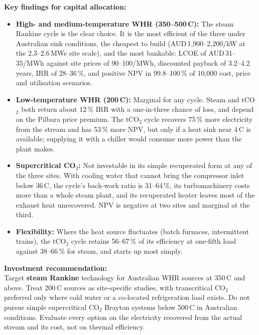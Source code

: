 \documentclass[12pt,a4paper]{report}
\begin{document}
\textbf{Key findings for capital allocation:}
\begin{itemize}[leftmargin=1.5em,itemsep=6pt]
\item \textbf{High- and medium-temperature WHR (350--500\,\textdegree C):}
The steam Rankine cycle is the clear choice. It is the most efficient of the
three under Australian sink conditions, the cheapest to build
(AUD\,1{,}900--2{,}200/kW at the 2.3--2.6\,MWe site scale), and the most
bankable: LCOE of AUD\,31--35/MWh against site prices of 90--100/MWh,
discounted payback of 3.2--4.2 years, IRR of 28--36\,\%, and positive NPV in
99.8--100\,\% of 10,000 cost, price and utilisation scenarios.
\item \textbf{Low-temperature WHR (200\,\textdegree C):} Marginal for any
cycle. Steam and tCO$_2$ both return about 12\,\% IRR with a one-in-three
chance of loss, and depend on the Pilbara price premium. The tCO$_2$ cycle
recovers 75\,\% more electricity from the stream and has 53\,\% more NPV, but
only if a heat sink near 4\,\textdegree C is available; supplying it with a
chiller would consume more power than the plant makes.
\item \textbf{Supercritical CO$_2$:} Not investable in its simple recuperated
form at any of the three sites. With cooling water that cannot bring the
compressor inlet below 36\,\textdegree C, the cycle's back-work ratio is
31--64\,\%, its turbomachinery costs more than a whole steam plant, and its
recuperated heater leaves most of the exhaust heat unrecovered. NPV is
negative at two sites and marginal at the third.
\item \textbf{Flexibility:} Where the heat source fluctuates (batch
furnaces, intermittent trains), the tCO$_2$ cycle retains 56--67\,\% of its
efficiency at one-fifth load against 38--66\,\% for steam, and starts up most
simply.
\end{itemize}

\textbf{Investment recommendation:}\\
Target \textbf{steam Rankine} technology for Australian WHR sources at
350\,\textdegree C and above. Treat 200\,\textdegree C sources as
site-specific studies, with transcritical CO$_2$ preferred only where cold
water or a co-located refrigeration load exists. Do not pursue simple
supercritical CO$_2$ Brayton systems below 500\,\textdegree C in Australian
conditions. Evaluate every option on the electricity recovered from the
actual stream and its cost, not on thermal efficiency.

\clearpage
\end{document}
